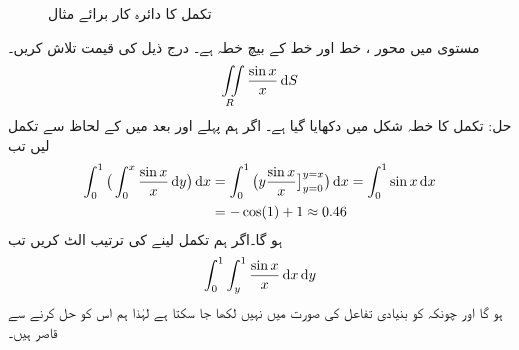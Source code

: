 \begin{figure}
\centering
{}
\caption{تکمل کا دائرہ کار برائے مثال }
\label{شکل_مثال_بالکثرت_غیر_بنیادی_تفاعل}
\end{figure}
مستوی  میں محور ، خط  اور خط  کے بیچ خطہ  ہے۔ درج ذیل کی قیمت تلاش کریں۔
\begin{align*}
\iint\limits_R \frac{\sin x}{x}\dif S
\end{align*}
حل:\quad
تکمل کا خطہ شکل   میں دکھایا گیا ہے۔ اگر ہم پہلے  اور بعد میں  کے لحاظ سے تکمل لیں تب
\begin{align*}
\int_0^1\big(\int_0^x \frac{\sin x}{x}\dif y\big)\dif x&=\int_0^1\big(y\frac{\sin x}{x}\big]_{y=0}^{y=x}\big)\dif x=\int_0^1\sin x\dif x\\
&=-\cos(1)+1\approx 0.46
\end{align*}
ہو گا۔اگر ہم تکمل لینے کی ترتیب الٹ کریں تب 
\begin{align*}
\int_0^1\int_y^1\frac{\sin x}{x}\dif x\dif y
\end{align*}
ہو گا اور چونکہ  کو  بنیادی تفاعل کی صورت میں نہیں لکھا جا سکتا ہے لہٰذا  ہم اس کو حل کرنے سے قاصر ہیں۔

